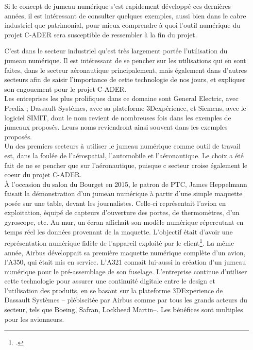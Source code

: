 
Si le concept de jumeau numérique s'est rapidement développé ces dernières années, il est intéressant de consulter quelques exemples, aussi bien dans le cabre industriel que patrimonial, pour mieux comprendre à quoi l'outil numérique du projet C-ADER sera susceptible de ressembler à la fin du projet.


C’est dans le secteur industriel qu’est très largement portée l’utilisation du jumeau numérique. Il est intéressant de se pencher sur les utilisations qui en sont faites, dans le secteur aéronautique principalement, mais également dans d'autres secteurs afin de saisir l'importance de cette technologie de nos jours, et expliquer son engouement pour le projet C-ADER.\\

Les entreprises les plus prolifiques dans ce domaine sont General Electric, avec Predix ; Dassault Systèmes, avec sa plateforme 3Dexpérience, et Siemens, avec le logiciel SIMIT, dont le nom revient de nombreuses fois dans les exemples de jumeaux proposés. Leurs noms reviendront ainsi souvent dans les exemples proposés.\\

Un des premiers secteurs à utiliser le jumeau numérique comme outil de travail est, dans la foulée de l’aérospatial, l’automobile et l’aéronautique. Le choix a été fait de ne se pencher que sur l'aéronautique, puisque c secteur croise également le coeur du projet C-ADER.\\

À l’occasion du salon du Bourget en 2015, le patron de PTC, James Heppelmann faisait la démonstration d’un jumeau numérique à partir d’une simple maquette posée sur une table, devant les journalistes. Celle-ci représentait l’avion en exploitation, équipé de capteurs d’ouverture des portes, de thermomètres, d’un gyroscope, etc. Au mur, un écran affichait son modèle numérique répercutant en temps réel les données provenant de la maquette. L’objectif était d’avoir une représentation numérique fidèle de l’appareil exploité par le client\footcite{gladieuxJumeauNumeriqueAeronautique2019}. La même année, Airbus développait sa première maquette numérique complète d'un avion, l'A350, qui était mis en service. L'A321 connaît lui-aussi la création d'un jumeau numérique pour le pré-assemblage de son fuselage. L'entreprise continue d'utiliser cette technologie pour assurer une continuité digitale entre le design et l'utilisation des produits, en se basant sur la plateforme 3DExperience de Dassault Systèmes – plébiscitée par Airbus comme par tous les grands acteurs du secteur, tels que Boeing, Safran, Lockheed Martin–. Les bénéfices sont multiples pour les avionneurs.\\ 


